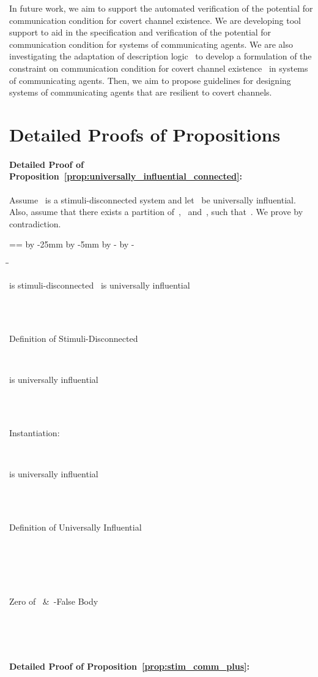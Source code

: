 \documentclass[copyright,creativecommons]{eptcs}
\makeatletter
\newcommand{\COC}{constraint on communication\@\xspace}
\newcommand{\PFC}{potential for communication\@\xspace}
\newcommand{\socas}{systems of communicating agents\@\xspace}
\newlength{\interligne}
\newcommand{\Beginproof}{\dimen123=\linewidth \dimen124=\linewidth
	\advance\dimen123 by -25mm \advance\dimen124 by -5mm
	\advance\dimen123 by -\parindent \advance\dimen124 by -\parindent
	\setlength{\interligne}{\baselineskip}
	\setlength{\baselineskip}{1.2\baselineskip}
    	\begin{tabbing}
    		\hspace*{\parindent}\= \hspace*{5mm}\= \kill \+ \kill}
\newcommand {\Endproof}
		{\end{tabbing}
    \setlength{\baselineskip}{\interligne}}
\newcommand{\com}[1]{\> \hspace*{15mm}
	~\parbox[t]{\dimen123}{ #1 }\\}
\newcommand{\pred}[1]{\>\parbox[t]{\dimen124}{#1}\\}
\newcommand{\hsep}{\quad\&\quad}
\makeatother
\begin{document}
In future work, we aim to support the automated verification of the \PFC condition for covert channel existence. We are developing tool support to aid in the specification and verification of the \PFC condition for \socas. We are also investigating the adaptation of description logic~\cite{Baader2003aa} to develop a formulation of the \COC condition for covert channel existence~\cite{Jaskolka2012aa} in \socas. Then, we aim to propose guidelines for designing \socas that are resilient to covert channels. 

\vspace{-0.2in}
 


\vspace{-0.2in}
\appendix
\section{Detailed Proofs of Propositions}
\label{sec:detailed_proofs}
\begingroup
\fontsize{11pt}{8pt}\selectfont
\vspace{-0.1in}
\paragraph{Detailed Proof of Proposition~\ref{prop:universally_influential_connected}:}
\label{sub:detailed_proof_of_proposition_universally_influential_connected}


Assume~ is a stimuli-disconnected system and let~ be universally influential. Also, assume that there exists a partition of~,~ and~, such that~. We prove by contradiction.		

\Beginproof
	\pred{ is stimuli-disconnected~ is universally influential}
	 \com{Definition of Stimuli-Disconnected}
	\pred{ is universally influential}
	 \com{Instantiation:~}
	\pred{ is universally influential}
	 \com{Definition of Universally Influential}
	\pred{}
	 \com{Zero of~ \hsep~-False Body}
	\pred{}
\Endproof




\vspace{-0.35in}
\paragraph{Detailed Proof of Proposition~\ref{prop:stim_comm_plus}:}
\label{sub:detailed_proof_of_proposition_stim_comm_plus}
\end{document}
